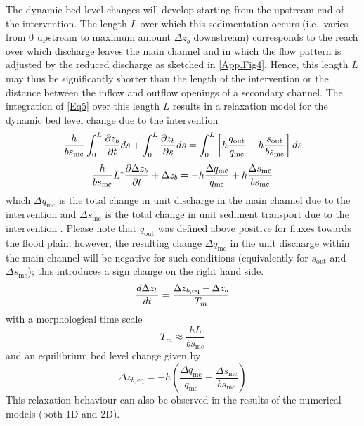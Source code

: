The dynamic bed level changes will develop starting from the upstream end of the intervention.
The length $L$ over which this sedimentation occurs (i.e.~varies from 0 upstream to maximum amount $\Delta z_b$ downstream) corresponds to the reach over which discharge leaves the main channel and in which the flow pattern is adjusted by the reduced discharge as sketched in \autoref{App.Fig4}.
Hence, this length $L$ may thus be significantly shorter than the length of the intervention or the distance between the inflow and outflow openings of a secondary channel.
The integration of \autoref{Eq5} over this length $L$ results in a relaxation model for the dynamic bed level change due to the intervention
%
\begin{equation}
\frac{h}{b s_\text{mc}} \int_0^L \pdiff{z_b}{t} ds + \int_0^L \pdiff{z_b}{s} ds = \int_0^L \left [ h \frac{q_\text{out}}{q_\text{mc}} - h \frac{s_\text{out}}{b s_\text{mc}} \right ] ds
\label{Eq5a}
\end{equation}
%
\begin{equation}
\frac{h}{b s_\text{mc}} L^* \pdiff{\Delta z_b}{t} + \Delta z_b = - h \frac{\Delta q_\text{mc}}{q_\text{mc}} + h \frac{\Delta s_\text{mc}}{b s_\text{mc}}
\label{Eq5b}
\end{equation}
%
which $\Delta q_\text{mc}$ is the total change in unit discharge in the main channel due to the intervention \unitbrackets{\SI{}{\metre\squared\per\second}} and $\Delta s_\text{mc}$ is the total change in unit sediment transport due to the intervention \unitbrackets{\SI{}{\metre\squared\per\second}}.
Please note that $q_\text{out}$ was defined above positive for fluxes towards the flood plain, however, the resulting change $\Delta q_\text{mc}$ in the unit discharge within the main channel will be negative for such conditions (equivalently for $s_\text{out}$ and $\Delta s_\text{mc}$); this introduces a sign change on the right hand side.
%
\begin{equation}
\diff{\Delta z_b}{t} = \frac{\Delta z_{b,\text{eq}} - \Delta z_b}{T_m}
\label{Eq5dif}
\end{equation}
%
with a morphological time scale \unitbrackets{\SI{}{\second}}
%
\begin{equation}
T_m \approx \frac{h L}{b s_\text{mc}}
\label{Eq5T}
\end{equation}
%
and an equilibrium bed level change \unitbrackets{\SI{}{\metre}} given by
%
\begin{equation}
\Delta z_{b,\text{eq}} = -h \left ( \frac{\Delta q_\text{mc}}{q_\text{mc}} - \frac{\Delta s_\text{mc}}{b s_\text{mc}} \right )
\label{Eq6}
\end{equation}
%
This relaxation behaviour can also be observed in the results of the numerical models (both 1D and 2D).

